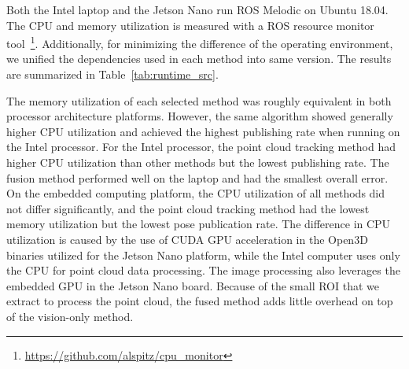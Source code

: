 Both the Intel laptop and the Jetson Nano run ROS Melodic on Ubuntu 18.04. The CPU and memory utilization is measured with a ROS resource monitor tool~\footnote{\href{https://github.com/alspitz/cpu_monitor}{https://github.com/alspitz/cpu\_monitor}}. Additionally, for minimizing the difference of the operating environment, we unified the dependencies used in each method into same version. The results are summarized in Table~\ref{tab:runtime_src}.

The memory utilization of each selected method was roughly equivalent in both processor architecture platforms. However, the same algorithm showed generally higher CPU utilization and achieved the highest publishing rate when running on the Intel processor. For the Intel processor, the point cloud tracking method had higher CPU utilization than other methods but the lowest publishing rate. The fusion method performed well on the laptop and had the smallest overall error. On the embedded computing platform, the CPU utilization of all methods did not differ significantly, and the point cloud tracking method had the lowest memory utilization but the lowest pose publication rate. The difference in CPU utilization is caused by the use of CUDA GPU acceleration in the Open3D binaries utilized for the Jetson Nano platform, while the Intel computer uses only the CPU for point cloud data processing. The image processing also leverages the embedded GPU in the Jetson Nano board. Because of the small ROI that we extract to process the point cloud, the fused method adds little overhead on top of the vision-only method.










